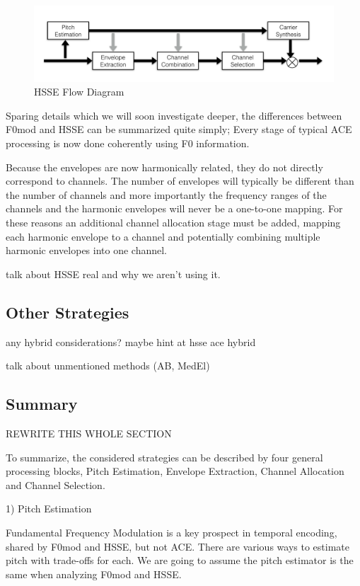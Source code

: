 \documentclass [11pt, proquest] {uwthesis}[2015/03/03]
\begin{document}
\begin{figure}[!ht]
  \centering
    \includegraphics[width=1\textwidth]{HSSE_flow_diagramTEMP}   
    \caption{HSSE Flow Diagram}
\end{figure}

Sparing details which we will soon investigate deeper, the differences between F0mod and HSSE can be summarized quite simply;  Every stage of typical ACE processing is now done coherently using F0 information.

Because the envelopes are now harmonically related, they do not directly correspond to channels.  The number of envelopes will typically be different than the number of channels and more importantly the frequency ranges of the channels and the harmonic envelopes will never be a one-to-one mapping.  For these reasons an additional channel allocation stage must be added, mapping each harmonic envelope to a channel and potentially combining multiple harmonic envelopes into one channel.

talk about HSSE real{} and why we aren't using it.

\subsection{Other Strategies}

any hybrid considerations?  maybe hint at hsse ace hybrid

talk about unmentioned methods (AB, MedEl)

\subsection{Summary}

REWRITE THIS WHOLE SECTION

To summarize, the considered strategies can be described by four general processing blocks, Pitch Estimation, Envelope Extraction, Channel Allocation and Channel Selection.

1) Pitch Estimation

Fundamental Frequency Modulation is a key prospect in temporal encoding, shared by F0mod and HSSE, but not ACE.  There are various ways to estimate pitch with trade-offs for each.  We are going to assume the pitch estimator is the same when analyzing F0mod and HSSE.
\end{document}

